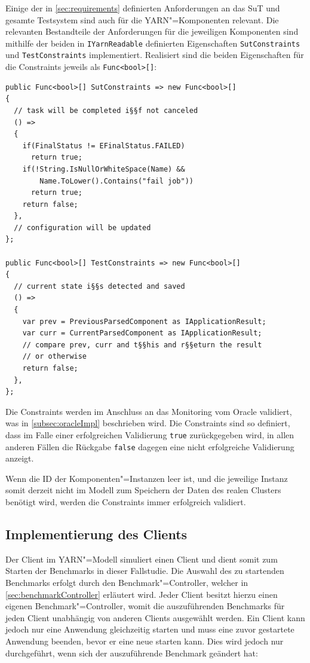 Einige der in \cref{sec:requirements} definierten Anforderungen an das \gls{SuT} und gesamte Testsystem sind auch für die \gls{YARN}"=Komponenten relevant.
Die relevanten Bestandteile der Anforderungen für die jeweiligen Komponenten sind mithilfe der beiden in \texttt{IYarnReadable} definierten Eigenschaften \texttt{SutConstraints} und \texttt{TestConstraints} implementiert.
Realisiert sind die beiden Eigenschaften für die Constraints jeweils als \texttt{Func<bool>[]}:

\begin{lstlisting}[label=lst:constraintDefinition,style=cs,
caption={[Definition der Constraints in YarnApp]
    Definition der Constraints in \texttt{YarnApp} (gekürzt)}]
public Func<bool>[] SutConstraints => new Func<bool>[]
{
  // task will be completed i§§f not canceled
  () =>
  {
    if(FinalStatus != EFinalStatus.FAILED)
      return true;
    if(!String.IsNullOrWhiteSpace(Name) &&
        Name.ToLower().Contains("fail job"))
      return true;
    return false;
  },
  // configuration will be updated
};

public Func<bool>[] TestConstraints => new Func<bool>[]
{
  // current state i§§s detected and saved
  () =>
  {
    var prev = PreviousParsedComponent as IApplicationResult;
    var curr = CurrentParsedComponent as IApplicationResult;
    // compare prev, curr and t§§his and r§§eturn the result
    // or otherwise
    return false;
  },
};
\end{lstlisting}

Die Constraints werden im Anschluss an das Monitoring vom Oracle validiert, was in \cref{subsec:oracleImpl} beschrieben wird.
Die Constraints sind so definiert, dass im Falle einer erfolgreichen Validierung \texttt{true} zurückgegeben wird, in allen anderen Fällen die Rückgabe \texttt{false} dagegen eine nicht erfolgreiche Validierung anzeigt.

Wenn die ID der Komponenten"=Instanzen leer ist, und die jeweilige Instanz somit derzeit nicht im Modell zum Speichern der Daten des realen Clusters benötigt wird, werden die Constraints immer erfolgreich validiert.

\subsection{Implementierung des Clients}
\label{subsec:yarnClient}

Der Client im \gls{YARN}"=Modell simuliert einen Client und dient somit zum Starten der Benchmarks in dieser Fallstudie.
Die Auswahl des zu startenden Benchmarks erfolgt durch den Benchmark"=Controller, welcher in \cref{sec:benchmarkController} erläutert wird.
Jeder Client besitzt hierzu einen eigenen Benchmark"=Controller, womit die auszuführenden Benchmarks für jeden Client unabhängig von anderen Clients ausgewählt werden.
Ein Client kann jedoch nur eine \gls{Anwendung} gleichzeitig starten und muss eine zuvor gestartete \gls{Anwendung} beenden, bevor er eine neue starten kann.
Dies wird jedoch nur durchgeführt, wenn sich der auszuführende Benchmark geändert hat:

